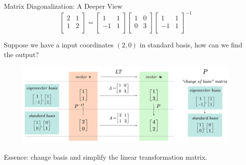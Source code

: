 \documentclass{beamer}
\begin{document}
        \begin{frame}{Matrix Diagonalization: A Deeper View}
            \begin{equation*}
                \left[ \begin{matrix}
                    2&		1\\
                    1&		2\\
                \end{matrix} \right] =\left[ \begin{matrix}
                    1&		1\\
                    -1&		1\\
                \end{matrix} \right] \left[ \begin{matrix}
                    1&		0\\
                    0&		3\\
                \end{matrix} \right] \left[ \begin{matrix}
                    1&		1\\
                    -1&		1\\
                \end{matrix} \right] ^{-1}
            \end{equation*}
        
        Suppose we have a input coordinates $(2,0)$ in standard basis, how can we find the output?
        \begin{figure}
            \centering
            \includegraphics[width=\textwidth]{PNP-1.jpg}
        \end{figure}
        
        Essence: change basis and simplify the linear transformation matrix.
        \end{frame}
        
\end{document}
